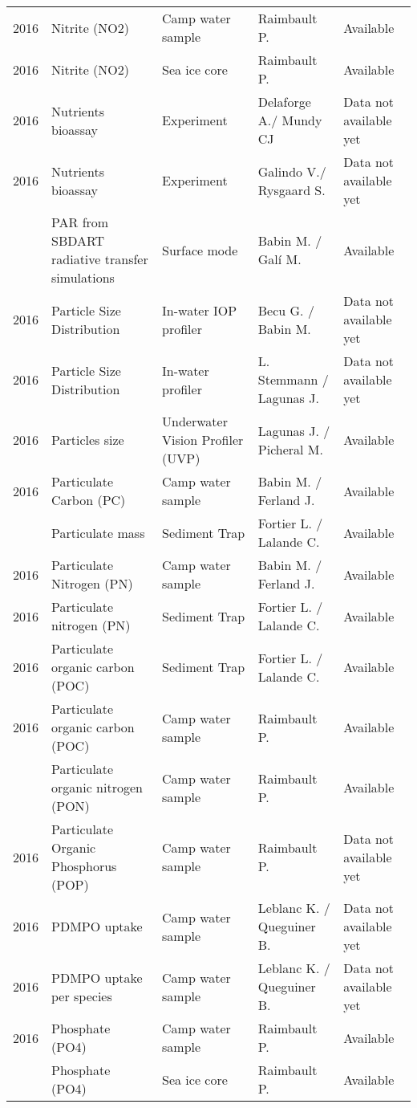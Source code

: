 \documentclass[]{article}
\begin{document}
\begin{landscape}
\begin{longtable}{rllll}
2016 & Nitrite (NO2) & Camp water sample & Raimbault P. & Available\\
2016 & Nitrite (NO2) & Sea ice core & Raimbault P. & Available\\
2016 & Nutrients bioassay & Experiment & Delaforge A./ Mundy CJ & Data not available yet\\
2016 & Nutrients bioassay & Experiment & Galindo V./ Rysgaard S. & Data not available yet\\
\addlinespace
2016 & PAR from SBDART radiative transfer simulations & Surface mode & Babin M. / Galí M. & Available\\
2016 & Particle Size Distribution & In-water IOP profiler & Becu G. / Babin M. & Data not available yet\\
2016 & Particle Size Distribution & In-water profiler & L. Stemmann / Lagunas J. & Data not available yet\\
2016 & Particles size & Underwater Vision Profiler (UVP) & Lagunas J. / Picheral M. & Available\\
2016 & Particulate Carbon (PC) & Camp water sample & Babin M. / Ferland J. & Available\\
\addlinespace
2016 & Particulate mass & Sediment Trap & Fortier L. / Lalande C. & Available\\
2016 & Particulate Nitrogen (PN) & Camp water sample & Babin M. / Ferland J. & Available\\
2016 & Particulate nitrogen (PN) & Sediment Trap & Fortier L. / Lalande C. & Available\\
2016 & Particulate organic carbon (POC) & Sediment Trap & Fortier L. / Lalande C. & Available\\
2016 & Particulate organic carbon (POC) & Camp water sample & Raimbault P. & Available\\
\addlinespace
2016 & Particulate organic nitrogen (PON) & Camp water sample & Raimbault P. & Available\\
2016 & Particulate Organic Phosphorus (POP) & Camp water sample & Raimbault P. & Data not available yet\\
2016 & PDMPO uptake & Camp water sample & Leblanc K. / Queguiner B. & Data not available yet\\
2016 & PDMPO uptake per species & Camp water sample & Leblanc K. / Queguiner B. & Data not available yet\\
2016 & Phosphate (PO4) & Camp water sample & Raimbault P. & Available\\
\addlinespace
2016 & Phosphate (PO4) & Sea ice core & Raimbault P. & Available\\

\end{longtable}
\end{landscape}
\end{document}
